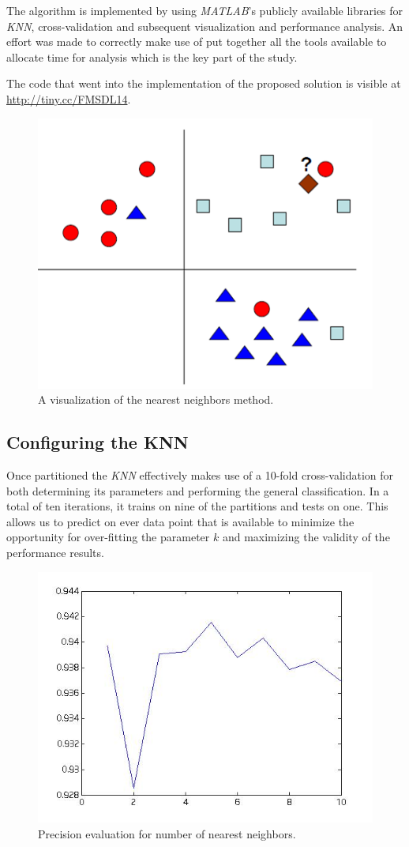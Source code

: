 \documentclass{sig-alternate}
\begin{document}
The algorithm is implemented by using \textit{MATLAB}'s publicly available libraries for \textit{KNN}, cross-validation and subsequent visualization and performance analysis. An effort was made to correctly make use of put together all the tools available to allocate time for analysis which is the key part of the study.

The code that went into the implementation of the proposed solution is visible at \url{http://tiny.cc/FMSDL14}.

\begin{figure}[bp]
\begin{center}
  \includegraphics[width=0.6\linewidth]{non_tech_imgs/knn_vis.png}
\end{center}
  \caption{A visualization of the nearest neighbors method.}
  \label{fig:knn_vis}
\end{figure}

\subsection{Configuring the KNN}
Once partitioned the \textit{KNN} effectively makes use of a 10-fold cross-validation for both determining its parameters and performing the general classification. In a total of ten iterations, it trains on nine of the partitions and tests on one. This allows us to predict on ever data point that is available to minimize the opportunity for over-fitting the parameter $k$ and maximizing the validity of the performance results.

\begin{figure}
\begin{center}
\includegraphics[width=0.6\linewidth]{visual_results/evaluate_k_both_perf.jpg}
\end{center}
\caption{Precision evaluation for number of nearest neighbors.}
\label{fig:eval_k_both_perf}
\end{figure}
\end{document}
